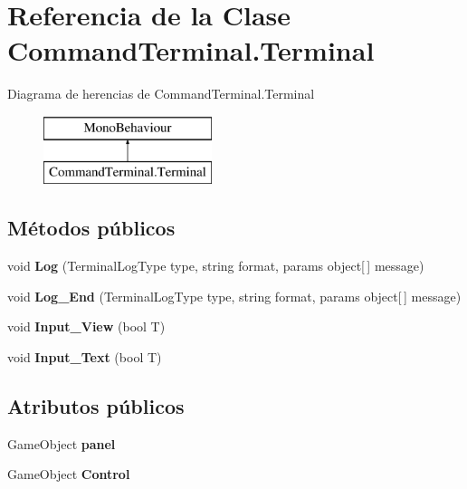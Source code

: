 \hypertarget{class_command_terminal_1_1_terminal}{}\section{Referencia de la Clase Command\+Terminal.\+Terminal}
\label{class_command_terminal_1_1_terminal}
Diagrama de herencias de Command\+Terminal.\+Terminal\begin{figure}[H]
\begin{center}
\leavevmode
\includegraphics[height=2.000000cm]{class_command_terminal_1_1_terminal}
\end{center}
\end{figure}
\subsection*{Métodos públicos}
\begin{DoxyCompactItemize}
\item 
\mbox{\label{class_command_terminal_1_1_terminal_aed10e8ce3d7b7c8f5844de0246b59fbc}} 
void {\bfseries Log} (Terminal\+Log\+Type type, string format, params object\mbox{[}$\,$\mbox{]} message)
\item 
\mbox{\label{class_command_terminal_1_1_terminal_a21b01ad621533deee8511f63cf5acb9c}} 
void {\bfseries Log\+\_\+\+End} (Terminal\+Log\+Type type, string format, params object\mbox{[}$\,$\mbox{]} message)
\item 
\mbox{\label{class_command_terminal_1_1_terminal_a58340ff13a5e389f9967cde9e42b7344}} 
void {\bfseries Input\+\_\+\+View} (bool T)
\item 
\mbox{\label{class_command_terminal_1_1_terminal_aea8cb3ff71030a8b7ca4d2fbb4131a7f}} 
void {\bfseries Input\+\_\+\+Text} (bool T)
\end{DoxyCompactItemize}
\subsection*{Atributos públicos}
\begin{DoxyCompactItemize}
\item 
\mbox{\label{class_command_terminal_1_1_terminal_a685acbda06ea2b49b4382ba2a10898af}} 
Game\+Object {\bfseries panel}
\item 
\mbox{\label{class_command_terminal_1_1_terminal_ad80c14560c6e2d60132f69207b3e7717}} 
Game\+Object {\bfseries Control}
\end{DoxyCompactItemize}

